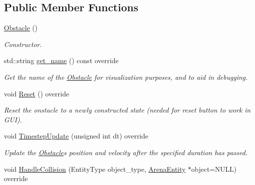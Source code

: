 \subsection*{Public Member Functions}
\begin{DoxyCompactItemize}
\item 
\hyperlink{classObstacle_a8f734072321fa06a7b7dae2d5f50f352}{Obstacle} ()\hypertarget{classObstacle_a8f734072321fa06a7b7dae2d5f50f352}{}\label{classObstacle_a8f734072321fa06a7b7dae2d5f50f352}

\begin{DoxyCompactList}\small\item\em Constructor. \end{DoxyCompactList}\item 
std\+::string \hyperlink{classObstacle_a4642d3f61b6e74fd5a9c91bb263dfe18}{get\+\_\+name} () const override\hypertarget{classObstacle_a4642d3f61b6e74fd5a9c91bb263dfe18}{}\label{classObstacle_a4642d3f61b6e74fd5a9c91bb263dfe18}

\begin{DoxyCompactList}\small\item\em Get the name of the \hyperlink{classObstacle}{Obstacle} for visualization purposes, and to aid in debugging. \end{DoxyCompactList}\item 
void \hyperlink{classObstacle_a5fb8be1be47445fc8286477312b5df62}{Reset} () override\hypertarget{classObstacle_a5fb8be1be47445fc8286477312b5df62}{}\label{classObstacle_a5fb8be1be47445fc8286477312b5df62}

\begin{DoxyCompactList}\small\item\em Reset the onstacle to a newly constructed state (needed for reset button to work in G\+UI). \end{DoxyCompactList}\item 
void \hyperlink{classObstacle_adda549c77a5a67aa5423cb0f84b986df}{Timestep\+Update} (unsigned int dt) override
\begin{DoxyCompactList}\small\item\em Update the \hyperlink{classObstacle}{Obstacle}\textquotesingle{}s position and velocity after the specified duration has passed. \end{DoxyCompactList}\item 
void \hyperlink{classObstacle_a642a86b3566bb4d531a79511e584f73b}{Handle\+Collision} (Entity\+Type object\+\_\+type, \hyperlink{classArenaEntity}{Arena\+Entity} $\ast$object=N\+U\+LL) override\hypertarget{classObstacle_a642a86b3566bb4d531a79511e584f73b}{}\label{classObstacle_a642a86b3566bb4d531a79511e584f73b}


\end{DoxyCompactItemize}
